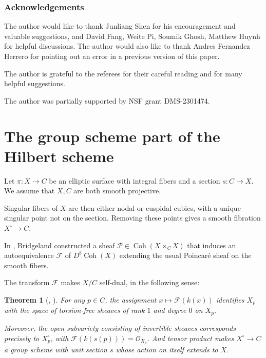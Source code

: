 \documentclass{amsart}
\theoremstyle{plain}
\newtheorem{theorem}{Theorem}[section]
\theoremstyle{definition}
\theoremstyle{remark}
\begin{document}
    \subsubsection*{Acknowledgements}
    The author would like to thank Junliang Shen for his encouragement and valuable suggestions, and David Fang, Weite Pi, Soumik Ghosh, Matthew Huynh for helpful discussions.
    The author would also like to thank Andres Fernandez Herrero for pointing out an error in a previous version of this paper.

    The author is grateful to the referees for their careful reading and for many helpful suggestions.

    The author was partially supported by NSF grant DMS-2301474.
    \section{The group scheme part of the Hilbert scheme}\label{ss:groupschemepart}
    Let $\pi:X\to C$ be an elliptic surface with integral fibers and a section $s:C\to X$.
    We assume that $X,C$ are both smooth projective.

    Singular fibers of $X$ are then either nodal or cuspidal cubics, with a unique singular point not on the section.
    Removing these points gives a smooth fibration $X^\circ\to C$.

    In \cite{bridgeland1998}, Bridgeland constructed a sheaf $\mathcal P\in\operatorname{Coh}(X\times_CX)$ that induces an autoequivalence $\mathcal F$ of $D^b\operatorname{Coh}(X)$ extending the usual Poincar\'e sheaf on the smooth fibers.

    The transform $\mathcal F$ makes $X/C$ self-dual, in the following sense:
    \begin{theorem}[\cite{bridgeland1998}, \cite{cubicdual}]\label{surfacegroupscheme}
        For any $p\in C$, the assignment $x\mapsto\mathcal F(k(x))$ identifies $X_p$ with the space of torsion-free sheaves of rank $1$ and degree $0$ on $X_p$.

        Moreover, the open subvariety consisting of invertible sheaves corresponds precisely to $X^\circ_p$, with $\mathcal F(k(s(p)))=\mathcal O_{X_p}$.
        And tensor product makes $X^\circ\to C$ a group scheme with unit section $s$ whose action on itself extends to $X$.
    \end{theorem}
\end{document}

